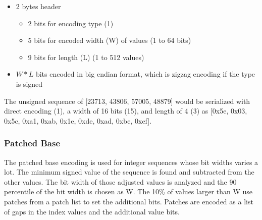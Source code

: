 \documentclass{article}
\begin{document}
\begin{itemize}
\item 2 bytes header
  \begin{itemize}
  \item 2 bits for encoding type (1)
  \item 5 bits for encoded width (W) of values (1 to 64 bits)
  \item 9 bits for length (L) (1 to 512 values)
  \end{itemize}
\item $W * L$ bits encoded in big endian format, which is
  zigzag encoding if the type is signed
\end{itemize}

The unsigned sequence of [23713, 43806, 57005, 48879] would be
serialized with direct encoding (1), a width of 16 bits (15), and
length of 4 (3) as [0x5e, 0x03, 0x5c, 0xa1, 0xab, 0x1e, 0xde, 0xad,
  0xbe, 0xef].

\subsubsection{Patched Base}

The patched base encoding is used for integer sequences whose bit
widths varies a lot. The minimum signed value of the sequence is found
and subtracted from the other values. The bit width of those adjusted
values is analyzed and the 90 percentile of the bit width is chosen
as W.  The 10\% of values larger than W use patches from a patch list
to set the additional bits. Patches are encoded as a list of gaps in
the index values and the additional value bits.
\end{document}
